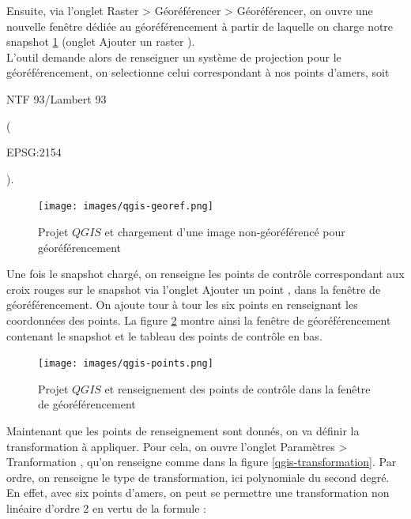 \documentclass{book}
\begin{document}
\clearpage

Ensuite, via l'onglet \og Raster > Géoréférencer > Géoréférencer\fg{}, on ouvre 
une nouvelle fen\^{e}tre dédiée au géoréférencement à partir de laquelle on charge notre snapshot \ref{qgis-georef} 
(onglet \og Ajouter un raster \fg{}).\\
L'outil demande alors de renseigner un système de projection pour le géoréférencement, on selectionne celui correspondant 
à nos points d'amers, soit \begin{itshape}NTF 93/Lambert 93\end{itshape} (\begin{itshape}EPSG:2154\end{itshape}).

\begin{figure}[H]
\begin{center}
\texttt{[image: images/qgis-georef.png]}
\end{center}
\caption{Projet $QGIS$ et chargement d'une image non-géoréférencé pour géoréférencement}
\label{qgis-georef}
\end{figure}

\clearpage

Une fois le snapshot chargé, on renseigne les points de contr\^{o}le correspondant aux croix rouges sur le snapshot via l'onglet 
\og Ajouter un point \fg{}, dans la fenêtre de géoréférencement. On ajoute tour à tour les six points en renseignant
les coordonnées des points. La figure \ref{qgis-points} montre ainsi la fen\^{e}tre de géoréférencement contenant le snapshot 
et le tableau des points de contr\^{o}le en bas.

\begin{figure}[H]
\begin{center}
\texttt{[image: images/qgis-points.png]}
\end{center}
\caption{Projet $QGIS$ et renseignement des points de contr\^{o}le dans la fen\^{e}tre de géoréférencement}
\label{qgis-points}
\end{figure}

\clearpage

Maintenant que les points de renseignement sont donnés, on va définir la transformation à appliquer. Pour cela, on ouvre l'onglet
 \og Paramètres > Tranformation \fg{}, qu'on renseigne comme dans la figure \ref{qgis-transformation}. Par ordre, 
on renseigne le type de transformation, ici polynomiale du second degré. En effet, avec six points d'amers, on peut se permettre
une transformation non linéaire d'ordre 2 en vertu de la formule \cite{Nicolas:2014}:
\end{document}
